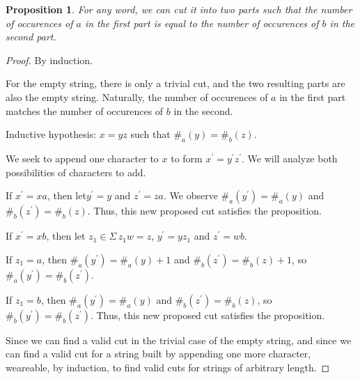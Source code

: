 \documentclass[letterpaper,11pt]{article}
\newtheorem{proposition}{Proposition}
\begin{document}
\begin{description}
\begin{enumerate}
\begin{proposition}
                    For any word, we can cut it into two parts such that the
                    number of occurences of $a$ in the first part is equal to
                    the number of occurences of $b$ in the second part.
                \end{proposition}

                \begin{proof}
                    By induction.

                    For the empty string, there is only a trivial cut, and the
                    two resulting parts are also the empty string. Naturally,
                    the number of occurences of $a$ in the first part matches
                    the number of occurences of $b$ in the second.

                    Inductive hypothesis: $x = yz$ such that
                    $\#_a(y) = \#_b(z)$.

                    We seek to append one character to $x$ to form
                    $x^\prime=y^\prime z^\prime$. We will analyze both
                    possibilities of characters to add.

                    If $x^\prime=xa$,
                    then let$y^\prime=y$
                    and
                    $z^\prime=za$.
                    We observe $\#_a(y^\prime)=\#_a(y)$
                    and
                    $\#_b(z^\prime)=\#_b(z)$.
                    Thus, this new proposed cut satisfies the proposition.

                    If $x^\prime=xb$, then
                    let $z_1\in\Sigma\,z_1w=z$,
                    $y^\prime=yz_1$
                    and
                    $z^\prime=wb$.

                    If $z_1=a$,
                    then $\#_a(y^\prime)=\#_a(y)+1$
                    and
                    $\#_b(z^\prime)=\#_b(z)+1$,
                    so
                    $\#_a(y^\prime)=\#_b(z^\prime)$.

                    If $z_1=b$,
                    then $\#_a(y^\prime)=\#_a(y)$
                    and
                    $\#_b(z^\prime)=\#_b(z)$,
                    so
                    $\#_b(y^\prime)=\#_b(z^\prime)$.
                    Thus, this new proposed cut satisfies the proposition.

                    Since we can find a valid cut in the trivial case of the
                    empty string, and since we can find a valid cut for a
                    string built by appending one more character, weareable,
                    by induction, to find valid cuts for strings of arbitrary
                    length.
                \end{proof}
        \end{enumerate}


\end{description}
\end{document}
